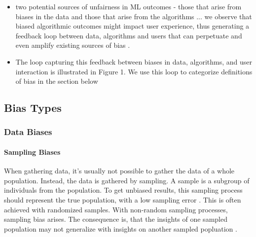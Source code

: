 \begin{refsection}
		\rawcitationusedstart
		\begin{itemize}
			\item two potential sources of unfairness in \gls{ML} outcomes - those that arise from biases in the data and those that arise from the algorithms ... we observe that biased algorithmic outcomes might impact user experience, thus generating a feedback loop between data, algorithms and users that can perpetuate and even amplify existing sources of bias \autocite{Mehrabi_2021}.
			\item The loop capturing this feedback between biases in data, algorithms, and user interaction is illustrated in Figure 1. We use this loop to categorize definitions of bias in the section below \autocite{Mehrabi_2021}
		\end{itemize}
		\rawcitationusedend
		
		
		\subsection{Bias Types}
		
		\subsubsection{Data Biases}
		
		\paragraph{Sampling Biases}
		When gathering data, it's usually not possible to gather the data of a whole population. Instead, the data is gathered by sampling. A sample is a subgroup of individuals from the population. To get unbiased results, this sampling process should represent the true population, with a low sampling error \autocites{HP_2022}. This is often achieved with randomized samples. With non-random sampling processes, sampling bias arises. The consequence is, that the insights of one sampled population may not generalize with insights on another sampled popluation \autocite{Mehrabi_2021}.
		

\end{refsection}
